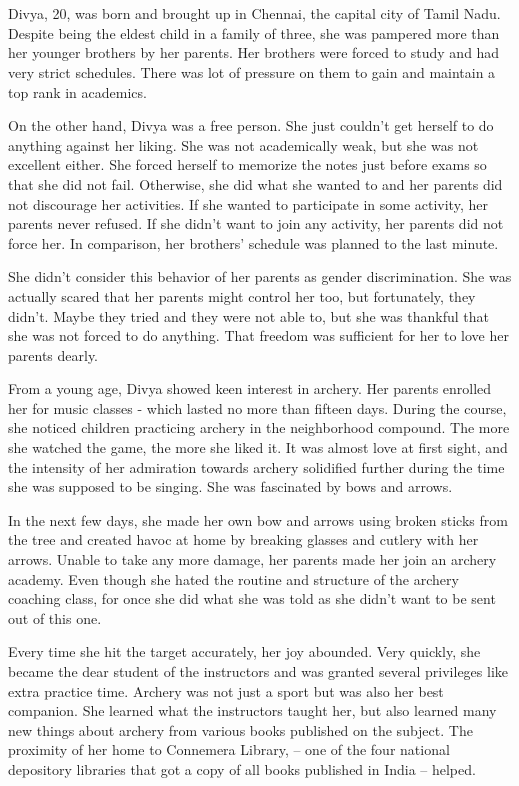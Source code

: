 \chapter{}

Divya, 20, was born and brought up in Chennai, the capital city of Tamil Nadu.
Despite being the eldest child in a family of three, she was pampered more than
her younger brothers by her parents. Her brothers were forced to study and had
very strict schedules. There was lot of pressure on them to gain and maintain a
top rank in academics.

On the other hand, Divya was a free person. She just couldn't get herself to do
anything against her liking. She was not academically weak, but she was not
excellent either. She forced herself to memorize the notes just before exams so
that she did not fail. Otherwise, she did what she wanted to and her parents did
not discourage her activities. If she wanted to participate in some activity,
her parents never refused. If she didn't want to join any activity, her parents
did not force her. In comparison, her brothers' schedule was planned to the last
minute.

She didn't consider this behavior of her parents as gender discrimination. She
was actually scared that her parents might control her too, but fortunately,
they didn't. Maybe they tried and they were not able to, but she was thankful
that she was not forced to do anything. That freedom was sufficient for her to
love her parents dearly.

From a young age, Divya showed keen interest in archery. Her parents enrolled
her for music classes - which lasted no more than fifteen days. During the
course, she noticed children practicing archery in the neighborhood compound.
The more she watched the game, the more she liked it. It was almost love at
first sight, and the intensity of her admiration towards archery solidified
further during the time she was supposed to be singing. She was fascinated by
bows and arrows.

In the next few days, she made her own bow and arrows using broken sticks from
the tree and created havoc at home by breaking glasses and cutlery with her
arrows. Unable to take any more damage, her parents made her join an archery
academy. Even though she hated the routine and structure of the archery coaching
class, for once she did what she was told as she didn't want to be sent out of
this one.

Every time she hit the target accurately, her joy abounded. Very quickly, she
became the dear student of the instructors and was granted several privileges
like extra practice time. Archery was not just a sport but was also her best
companion. She learned what the instructors taught her, but also learned many
new things about archery from various books published on the subject. The
proximity of her home to Connemera Library, – one of the four national
depository libraries that got a copy of all books published in India – helped.

